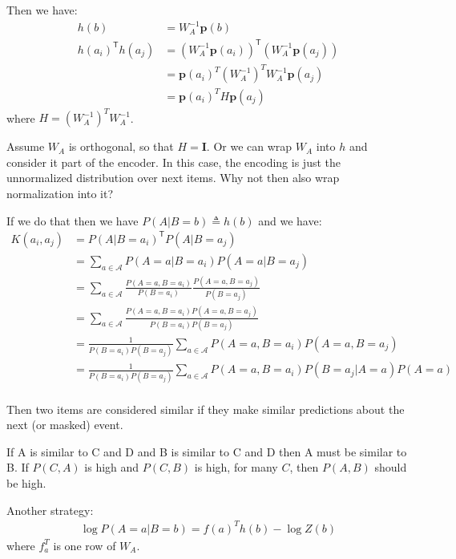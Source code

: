 \documentclass{article}
\theoremstyle{plain}
\theoremstyle{definition}
\theoremstyle{remark}
\newcommand{\transpose}{\mathsf{T}}
\begin{document}
Then we have:
\begin{align}
    h(b) &= W_A^{-1} \mathbf{p}(b)\\
    h(a_i)^\transpose h(a_j) &= (W_A^{-1} \mathbf{p}(a_i))^\transpose(W_A^{-1} \mathbf{p}(a_j))\\
    &= \mathbf{p}(a_i)^T (W_A^{-1})^TW_A^{-1} \mathbf{p}(a_j)\\
    &= \mathbf{p}(a_i)^T H \mathbf{p}(a_j)
\end{align}
where $H = (W_A^{-1})^TW_A^{-1}$.

Assume $W_A$ is orthogonal, so that $H = \mathbf{I}$. Or we can wrap $W_A$ into $h$ and consider it part of the encoder. In this case, the encoding is just the unnormalized distribution over next items. Why not then also wrap normalization into it?

If we do that then we have $P(A | B = b) \triangleq h(b)$ and we have:
\begin{align}
    K(a_i,a_j) &= P(A | B = a_i)^\transpose P(A | B = a_j)\\
    &= \sum_{a \in \mathcal{A}} P(A = a | B = a_i) P(A = a | B = a_j)\\
    &= \sum_{a \in \mathcal{A}} \frac{P(A = a, B = a_i)}{P(B = a_i)} \frac{P(A = a, B = a_j)}{P(B = a_j)}\\
    &= \sum_{a \in \mathcal{A}} \frac{P(A = a, B = a_i)P(A = a, B = a_j)}{P(B = a_i)P(B = a_j)}\\
    &= \frac{1}{P(B = a_i)P(B = a_j)} \sum_{a \in \mathcal{A}} P(A = a, B = a_i)P(A = a, B = a_j)\\
    &= \frac{1}{P(B = a_i)P(B = a_j)} \sum_{a \in \mathcal{A}} P(A = a, B = a_i)P(B = a_j | A = a)P(A = a)\\
\end{align}

Then two items are considered similar if they make similar predictions about the next (or masked) event.

If A is similar to C and D and B is similar to C and D then A must be similar to B. If $P(C,A)$ is high and $P(C,B)$ is high, for many $C$, then $P(A,B)$ should be high.


Another strategy:
\begin{align}
    \log P(A = a | B = b) = f(a)^T h(b) - \log Z(b)
\end{align}
where $f_a^T$ is one row of $W_A$. 
\end{document}

